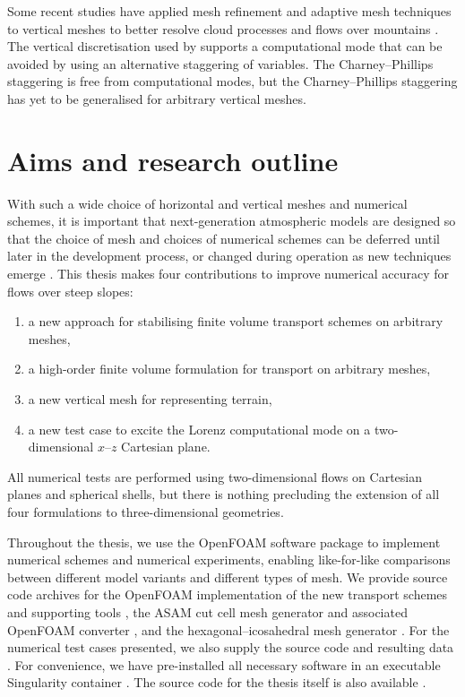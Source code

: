 Some recent studies have applied mesh refinement and adaptive mesh techniques to vertical meshes to better resolve cloud processes \citep{mueller2013} and flows over mountains \citep{yamazaki-satomura2012}.  
The vertical discretisation used by \citet{yamazaki-satomura2012} supports a computational mode \citep{thuburn-woolings2005} that can be avoided by using an alternative staggering of variables.
The Charney--Phillips staggering is free from computational modes, but the Charney--Phillips staggering has yet to be generalised for arbitrary vertical meshes.

\section{Aims and research outline}

With such a wide choice of horizontal and vertical meshes and numerical schemes, it is important that next-generation atmospheric models are designed so that the choice of mesh and choices of numerical schemes can be deferred until later in the development process, or changed during operation as new techniques emerge \citep{ford2013, theurich2016}.
This thesis makes four contributions to improve numerical accuracy for flows over steep slopes:
\begin{enumerate}
\item a new approach for stabilising finite volume transport schemes on arbitrary meshes,
\item a high-order finite volume formulation for transport on arbitrary meshes,
\item a new vertical mesh for representing terrain,
\item a new test case to excite the Lorenz computational mode on a two-dimensional $x$--$z$ Cartesian plane.
\end{enumerate}
All numerical tests are performed using two-dimensional flows on Cartesian planes and spherical shells, but there is nothing precluding the extension of all four formulations to three-dimensional geometries.

Throughout the thesis, we use the OpenFOAM software package  to implement numerical schemes and numerical experiments, enabling like-for-like comparisons between different model variants and different types of mesh.
We provide source code archives for the OpenFOAM implementation of the new transport schemes \citep{atmosfoam,highOrderFit} and supporting tools \citep{atmosfoam-tools,ninjaopenfoam}, the ASAM cut cell mesh generator \citep{asam_grid} and associated OpenFOAM converter \citep{gmv2openfoam}, and the hexagonal–icosahedral mesh generator \citep{geodesic-mesh}.
For the numerical test cases presented, we also supply the source code \citep{atmostests} and resulting data \citep{atmostests-results}.
For convenience, we have pre-installed all necessary software in an executable Singularity container \citep{atmostests-singularity}.
The source code for the thesis itself is also available \citep{thesis}.

